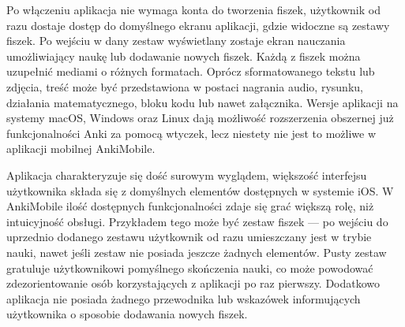 \documentclass[final,a4paper,openany,12pt]{mwbk}
\begin{document}
Po włączeniu aplikacja nie wymaga konta do tworzenia fiszek, użytkownik od razu dostaje dostęp do domyślnego ekranu aplikacji, gdzie widoczne są zestawy fiszek. Po wejściu w dany zestaw wyświetlany zostaje ekran nauczania umożliwiający naukę lub dodawanie nowych fiszek. Każdą z fiszek można uzupełnić mediami o różnych formatach. Oprócz sformatowanego tekstu lub zdjęcia, treść może być przedstawiona w postaci nagrania audio, rysunku, działania matematycznego, bloku kodu lub nawet załącznika. Wersje aplikacji na systemy macOS, Windows oraz Linux dają możliwość rozszerzenia obszernej już funkcjonalności Anki za pomocą wtyczek, lecz niestety nie jest to możliwe w aplikacji mobilnej AnkiMobile. 
    
Aplikacja charakteryzuje się dość surowym wyglądem, większość interfejsu użytkownika składa się z domyślnych elementów dostępnych w systemie iOS. W AnkiMobile ilość dostępnych funkcjonalności zdaje się grać większą rolę, niż intuicyjność obsługi. Przykładem tego może być zestaw fiszek --- po wejściu do uprzednio dodanego zestawu użytkownik od razu umieszczany jest w trybie nauki, nawet jeśli zestaw nie posiada jeszcze żadnych elementów. Pusty zestaw gratuluje użytkownikowi pomyślnego skończenia nauki, co może powodować zdezorientowanie osób korzystających z aplikacji po raz pierwszy. Dodatkowo aplikacja nie posiada żadnego przewodnika lub wskazówek informujących użytkownika o sposobie dodawania nowych fiszek.
\end{document}
